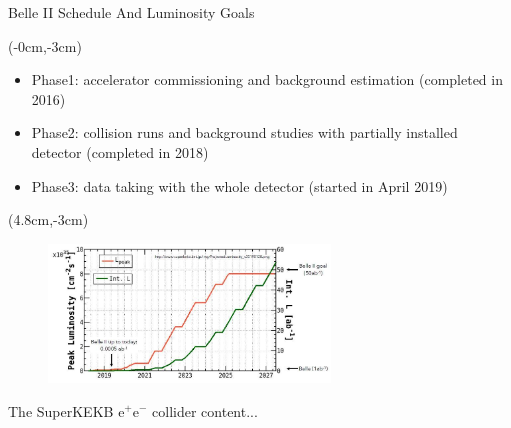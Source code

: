 \documentclass[8pt]{beamer}
\begin{document}
\begin{frame}{Belle II Schedule And Luminosity Goals}
	
	\begin{textblock*}{5cm}(-0cm,-3cm)
		\begin{center}	
			\begin{itemize}
				\item Phase1: accelerator commissioning and background estimation (completed in 2016)
				\item Phase2: collision runs and background studies with partially installed detector (completed in 2018)
				\item Phase3: data taking with the whole detector (started in April 2019)
			\end{itemize}
		\end{center}
		
	\end{textblock*}
	
	\begin{textblock*}{7cm}(4.8cm,-3cm)
	\begin{figure}
		\includegraphics[width=7.5cm]{VBilder/Lumen}
	\end{figure}
		
	
	\end{textblock*}
	
	
	
	
\end{frame}


\begin{frame}{The SuperKEKB $\textrm{e}^+\textrm{e}^-$ collider}
	content...
\end{frame}
\end{document}
